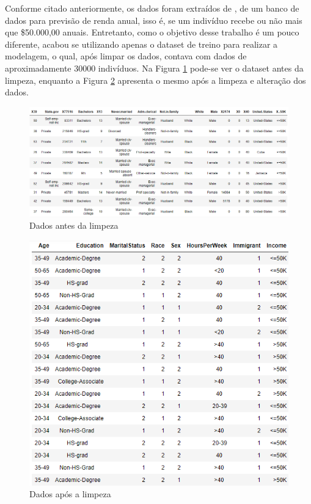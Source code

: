 \documentclass[11pt,letterpaper,twocolumn]{article}
\begin{document}
Conforme citado anteriormente, os dados foram extraídos de \cite{dua2019}, de um banco de dados para previsão de renda anual, isso é, se um indivíduo recebe ou não mais que \$50.000,00 anuais. Entretanto, como o objetivo desse trabalho é um pouco diferente, acabou se utilizando apenas o dataset de treino para realizar a modelagem, o qual, após limpar os dados, contava com dados de aproximadamente 30000 indivíduos. Na Figura \ref{table1} pode-se ver o dataset antes da limpeza, enquanto a Figura \ref{table2} apresenta o mesmo após a limpeza e alteração dos dados.
\begin{figure}
    \centering
    \includegraphics[scale = 0.3]{A2/Imagens/table1.png}
    \caption{Dados antes da limpeza}
    \label{table1}
\end{figure}

\begin{figure}
    \centering
    \includegraphics[scale = 0.5]{A2/Imagens/table2.png}
    \caption{Dados após a limpeza}
    \label{table2}
\end{figure}
\end{document}
